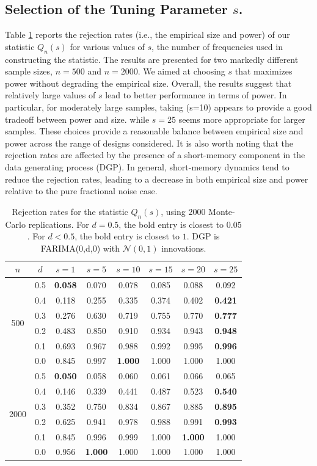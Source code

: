 \documentclass[12pt]{article}
\numberwithin{equation}{section}
\begin{document}
\subsection{Selection of the Tuning Parameter $s$.}
Table \ref{tab:sum_compare} reports the rejection rates (i.e., the empirical size and power) of our statistic \(Q_n(s)\) for various values of \(s\), the number of frequencies used in constructing the statistic. The results are presented for two markedly different sample sizes, \(n=500\) and \(n=2000\).
We aimed at choosing $s$ that maximizes power without degrading the empirical size.
Overall, the results suggest that relatively large values of \(s\) lead to better performance in terms of power. In particular, for moderately large samples, taking (s=10) appears to provide a good tradeoff between power and size.
while \(s=25\) seems more appropriate for larger samples. These choices provide a reasonable balance between empirical size and power across the range of designs considered.
It is also worth noting that the rejection rates are affected by the presence of a short-memory component in the data generating process (DGP). In general, short-memory dynamics tend to reduce the rejection rates, leading to a decrease in both empirical size and power relative to the pure fractional noise case.
% 
\begin{table}[H]
\centering
\caption{Rejection rates for the statistic $Q_n(s)$, using 2000 Monte-Carlo replications. For $d=0.5$, the bold entry is closest to $0.05$. For $d<0.5$, the bold entry is closest to $1$. DGP is FARIMA(0,d,0) with $\mathcal{N}(0,1)$ innovations.}
\label{tab:sum_compare}
\begin{tabular}{cccccccc}
\hline
$n$ & $d$ & $s=1$ & $s=5$ & $s=10$ & $s=15$ & $s=20$ & $s=25$ \\
\hline
\multirow{6}{*}{500} & 0.5 & \textbf{0.058} & 0.070 & 0.078 & 0.085 & 0.088 & 0.092 \\
 & 0.4 & 0.118 & 0.255 & 0.335 & 0.374 & 0.402 & \textbf{0.421} \\
 & 0.3 & 0.276 & 0.630 & 0.719 & 0.755 & 0.770 & \textbf{0.777} \\
 & 0.2 & 0.483 & 0.850 & 0.910 & 0.934 & 0.943 & \textbf{0.948} \\
 & 0.1 & 0.693 & 0.967 & 0.988 & 0.992 & 0.995 & \textbf{0.996} \\
 & 0.0 & 0.845 & 0.997 & \textbf{1.000} & 1.000 & 1.000 & 1.000 \\
\hline
\multirow{6}{*}{2000} & 0.5 & \textbf{0.050} & 0.058 & 0.060 & 0.061 & 0.066 & 0.065 \\
 & 0.4 & 0.146 & 0.339 & 0.441 & 0.487 & 0.523 & \textbf{0.540} \\
 & 0.3 & 0.352 & 0.750 & 0.834 & 0.867 & 0.885 & \textbf{0.895} \\
 & 0.2 & 0.625 & 0.941 & 0.978 & 0.988 & 0.991 & \textbf{0.993} \\
 & 0.1 & 0.845 & 0.996 & 0.999 & 1.000 & \textbf{1.000} & 1.000 \\
 & 0.0 & 0.956 & \textbf{1.000} & 1.000 & 1.000 & 1.000 & 1.000 \\
\hline
\end{tabular}
\end{table}
\end{document}
